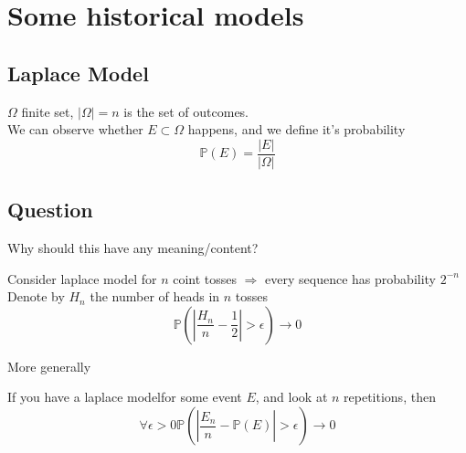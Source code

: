 \documentclass[../main.tex]{subfiles}
\begin{document}
\section{Some historical models}	
\subsection{Laplace Model}
\begin{defn}
	$\Omega $ finite set, $|\Omega| =n$ is the set of outcomes.\\
	We can observe whether $E \subset \Omega$ happens, and we define it's probability
	\[ 
		\mathbb{P}( E) = \frac{|E|}{|\Omega|}
	\]
	
\end{defn}
\subsection*{Question}
Why should this have any meaning/content?
\begin{propo}
Consider laplace model for $n$ coint tosses $\Rightarrow$ every sequence has probability $2^{-n}$\\
Denote by $H_n$ the number of heads in $n$ tosses
\[ 
	\mathbb{P}( |\frac{H_n}{n}-\frac{1}{2}|> \epsilon) \to 0
\]

\end{propo}
More generally
\begin{propo}
If you have a laplace modelfor some event $E$, and look at $n$ repetitions, then
\[ 
	\forall \epsilon >0 \mathbb{P}( |\frac{E_n}{n}-\mathbb{P}( E) |>\epsilon) \to 0
\]

\end{propo}
\end{document}
